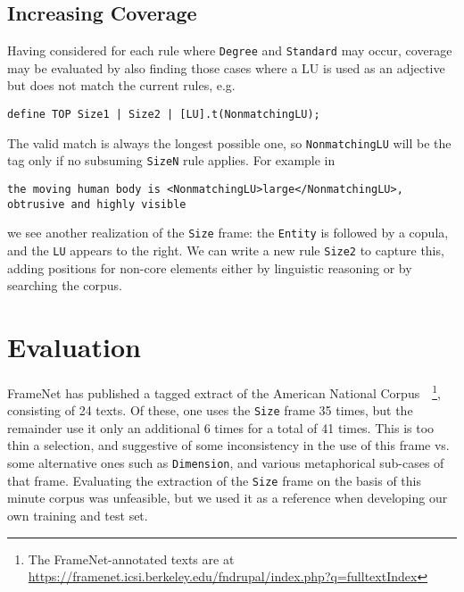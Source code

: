 \documentclass{llncs}
\begin{document}
\subsection{Increasing Coverage}
Having considered for each rule where \verb+Degree+ and \verb+Standard+ may occur, coverage may be evaluated by also finding those cases where a LU is used as an adjective but does not match the current rules, e.g.

\begin{center}
  \small
  \begin{framed}
\begin{verbatim}
define TOP Size1 | Size2 | [LU].t(NonmatchingLU);
\end{verbatim}
  \end{framed}
\end{center}
\normalsize

The valid match is always the longest possible one, so \verb+NonmatchingLU+ will be the tag only if no subsuming \verb+SizeN+ rule applies.
For example in

\begin{center}
\small
\begin{framed}
\begin{verbatim}
the moving human body is <NonmatchingLU>large</NonmatchingLU>,
obtrusive and highly visible
\end{verbatim}
\end{framed}
\end{center}
\normalsize

\noindent we see another realization of the \verb+Size+ frame: the \verb+Entity+ is followed by a
copula, and the \verb+LU+ appears to the right. We can write a new rule
\verb+Size2+ to capture this, adding positions for non-core elements either by
linguistic reasoning or by searching the corpus.

\section{Evaluation}

FrameNet has published a tagged extract of the American National
Corpus~\cite{anc}~\footnote{The FrameNet-annotated texts are at\\\url{https://framenet.icsi.berkeley.edu/fndrupal/index.php?q=fulltextIndex}},
consisting of 24 texts. Of these, one uses the \verb+Size+ frame 35 times, but the remainder use it only an additional 6 times
for a total of 41 times. This is too thin a selection, and suggestive of some inconsistency in the use of this frame vs.\@
some alternative ones such as \verb+Dimension+, and various metaphorical sub-cases of that frame.
Evaluating the extraction of the \verb+Size+ frame on the basis of this minute corpus was unfeasible, 
but we used it as a reference when developing our own training and test set.
\end{document}
